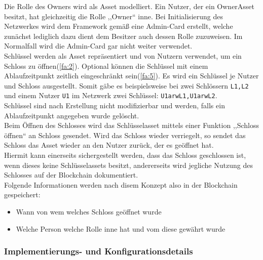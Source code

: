         \noindent Die Rolle des Owners wird als Asset modelliert. 
        Ein Nutzer, der ein OwnerAsset besitzt, hat gleichzeitig die Rolle ,,Owner`` inne.
        \noindent Bei Initialisierung des Netzwerkes wird dem Framework gemäß eine Admin-Card erstellt, welche zunächst lediglich dazu dient dem Besitzer auch dessen Rolle zuzuweisen.
        Im Normalfall wird die Admin-Card gar nicht weiter verwendet. 
        \medskip\\
        \noindent Schlüssel werden als Asset repräsentiert und von Nutzern verwendet, um ein Schloss zu öffnen(\ref{fa:2}). 
        Optional können die Schlüssel mit einem Ablaufzeitpunkt zeitlich eingeschränkt sein(\ref{fa:5}). 
        Es wird ein Schlüssel je Nutzer und Schloss ausgestellt. 
        Somit gäbe es beispielsweise bei zwei Schlössern \colorbox{light-gray}{\lstinline{L1,L2}} und einem Nutzer \colorbox{light-gray}{\lstinline{U1}} im Netzwerk zwei Schlüssel: \colorbox{light-gray}{\lstinline{U1arwL1,U1arwL2}}. \\
        Schlüssel sind nach Erstellung nicht modifizierbar und werden, falls ein Ablaufzeitpunkt angegeben wurde gelöscht. \\
        Beim Öffnen des Schlosses wird das Schlüsselasset mittels einer Funktion ,,Schloss öffnen`` an Schloss gesendet.
        Wird das Schloss wieder verriegelt, so sendet das Schloss das Asset wieder an den Nutzer zurück, der es geöffnet hat. \\
        Hiermit kann einerseits sichergestellt werden, dass das Schloss geschlossen ist, wenn dieses keine Schlüsselassets besitzt, andererseits wird jegliche Nutzung des Schlosses auf der Blockchain dokumentiert. 
        \medskip\\
        \noindent Folgende Informationen werden nach disem Konzept also in der Blockchain gespeichert:
        \begin{itemize}[noitemsep]
            \item Wann von wem welches Schloss geöffnet wurde
            \item Welche Person welche Rolle inne hat und vom diese gewährt wurde
        \end{itemize}
        
    \subsubsection{Implementierungs- und Konfigurationsdetails}
